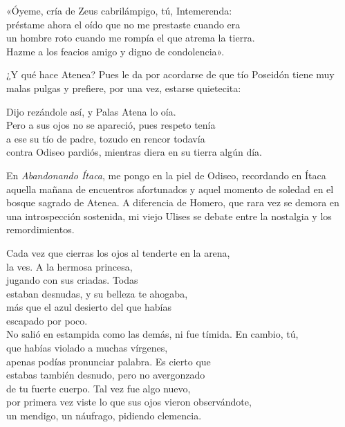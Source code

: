 \begin{versocita}
«Óyeme, cría de Zeus cabrilámpigo, tú, Intemerenda:\\
préstame ahora el oído que no me prestaste cuando era\\
un hombre roto cuando me rompía el que atrema la tierra.\\
Hazme a los feacios amigo y digno de condolencia».
\end{versocita}

¿Y qué hace Atenea? Pues le da por acordarse de que tío Poseidón tiene muy malas pulgas y prefiere, por una vez, estarse quietecita:

\begin{versocita}
Dijo rezándole así, y Palas Atena lo oía.\\
Pero a sus ojos no se apareció, pues respeto tenía\\
a ese su tío de padre, tozudo en rencor todavía\\
contra Odiseo pardiós, mientras diera en su tierra algún día.
\end{versocita}

En \emph{Abandonando Ítaca}, me pongo en la piel de Odiseo, recordando en Ítaca aquella mañana de encuentros afortunados y aquel momento de soledad en el bosque sagrado de Atenea. A diferencia de Homero, que rara vez se demora en una introspección sostenida, mi viejo Ulises se debate entre la nostalgia y los remordimientos.

\begin{versopropio}
Cada vez que cierras los ojos al tenderte en la arena,\\
la ves. A la hermosa princesa,\\
jugando con sus criadas. Todas\\
estaban desnudas, y su belleza te ahogaba,\\
más que el azul desierto del que habías\\
escapado por poco.\\
No salió en estampida como las demás, ni fue tímida. En cambio, tú,\\
que habías violado a muchas vírgenes,\\
apenas podías pronunciar palabra. Es cierto que\\
estabas también desnudo, pero no avergonzado\\
de tu fuerte cuerpo. Tal vez fue algo nuevo,\\
por primera vez viste lo que sus ojos vieron observándote,\\
un mendigo, un náufrago, pidiendo clemencia.
\end{versopropio}

